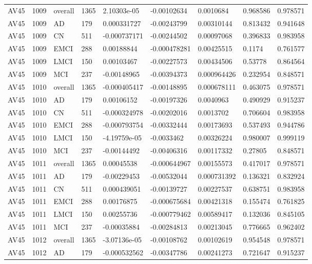 \begin{landscape}
\begin{longtable}{lllllllll}
AV45 & 1009 & overall & 1365 & 2.10303e-05 & -0.00102634 & 0.0010684 & 0.968586 & 0.978571 \\
AV45 & 1009 & AD & 179 & 0.000331727 & -0.00243799 & 0.00310144 & 0.813432 & 0.941648 \\
AV45 & 1009 & CN & 511 & -0.000737171 & -0.00244502 & 0.00097068 & 0.396833 & 0.983958 \\
AV45 & 1009 & EMCI & 288 & 0.00188844 & -0.000478281 & 0.00425515 & 0.1174 & 0.761577 \\
AV45 & 1009 & LMCI & 150 & 0.00103467 & -0.00227573 & 0.00434506 & 0.53778 & 0.864564 \\
AV45 & 1009 & MCI & 237 & -0.00148965 & -0.00394373 & 0.000964426 & 0.232954 & 0.848571 \\
AV45 & 1010 & overall & 1365 & -0.000405417 & -0.00148895 & 0.000678111 & 0.463075 & 0.978571 \\
AV45 & 1010 & AD & 179 & 0.00106152 & -0.00197326 & 0.0040963 & 0.490929 & 0.915237 \\
AV45 & 1010 & CN & 511 & -0.000324978 & -0.00202016 & 0.0013702 & 0.706604 & 0.983958 \\
AV45 & 1010 & EMCI & 288 & -0.000793754 & -0.00332444 & 0.00173693 & 0.537493 & 0.944786 \\
AV45 & 1010 & LMCI & 150 & -4.19759e-05 & -0.0033462 & 0.00326224 & 0.980007 & 0.999119 \\
AV45 & 1010 & MCI & 237 & -0.00144492 & -0.00406316 & 0.00117332 & 0.27805 & 0.848571 \\
AV45 & 1011 & overall & 1365 & 0.00045538 & -0.000644967 & 0.00155573 & 0.417017 & 0.978571 \\
AV45 & 1011 & AD & 179 & -0.00229453 & -0.00532044 & 0.000731392 & 0.136321 & 0.832924 \\
AV45 & 1011 & CN & 511 & 0.000439051 & -0.00139727 & 0.00227537 & 0.638751 & 0.983958 \\
AV45 & 1011 & EMCI & 288 & 0.00176875 & -0.000675684 & 0.00421318 & 0.155474 & 0.761825 \\
AV45 & 1011 & LMCI & 150 & 0.00255736 & -0.000779462 & 0.00589417 & 0.132036 & 0.845105 \\
AV45 & 1011 & MCI & 237 & -0.00035884 & -0.00284813 & 0.00213045 & 0.776665 & 0.962402 \\
AV45 & 1012 & overall & 1365 & -3.07136e-05 & -0.00108762 & 0.00102619 & 0.954548 & 0.978571 \\
AV45 & 1012 & AD & 179 & -0.000532562 & -0.00347786 & 0.00241273 & 0.721647 & 0.915237 \\

\end{longtable}
\end{landscape}
